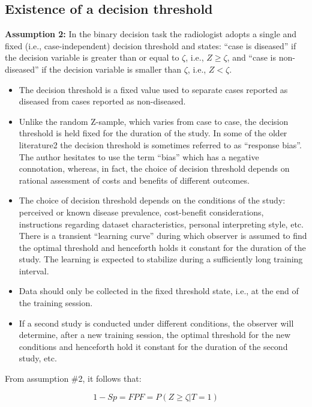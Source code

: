 \documentclass[
]{book}
\providecommand{\tightlist}{%
  \setlength{\itemsep}{0pt}\setlength{\parskip}{0pt}}
\begin{document}
\hypertarget{existence-of-a-decision-threshold}{%
\subsection{Existence of a decision threshold}\label{existence-of-a-decision-threshold}}

\textbf{Assumption 2:} In the binary decision task the radiologist adopts a single and fixed (i.e., case-independent) decision threshold and states: ``case is diseased'' if the decision variable is greater than or equal to \(\zeta\), i.e., \(Z \geq \zeta\), and ``case is non-diseased'' if the decision variable is smaller than \(\zeta\), i.e., \(Z <\zeta\).

\begin{itemize}
\tightlist
\item
  The decision threshold is a fixed value used to separate cases reported as diseased from cases reported as non-diseased.
\item
  Unlike the random Z-sample, which varies from case to case, the decision threshold is held fixed for the duration of the study. In some of the older literature2 the decision threshold is sometimes referred to as ``response bias''. The author hesitates to use the term ``bias'' which has a negative connotation, whereas, in fact, the choice of decision threshold depends on rational assessment of costs and benefits of different outcomes.
\item
  The choice of decision threshold depends on the conditions of the study: perceived or known disease prevalence, cost-benefit considerations, instructions regarding dataset characteristics, personal interpreting style, etc. There is a transient ``learning curve'' during which observer is assumed to find the optimal threshold and henceforth holds it constant for the duration of the study. The learning is expected to stabilize during a sufficiently long training interval.
\item
  Data should only be collected in the fixed threshold state, i.e., at the end of the training session.
\item
  If a second study is conducted under different conditions, the observer will determine, after a new training session, the optimal threshold for the new conditions and henceforth hold it constant for the duration of the second study, etc.
\end{itemize}

From assumption \#2, it follows that:

\begin{equation} 
1-Sp=FPF=P(Z\ge \zeta|T=1)
\label{eq:binaryTaskFPF}
\end{equation}
\end{document}
